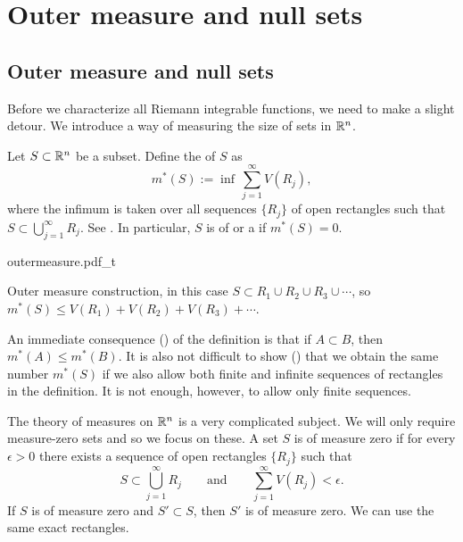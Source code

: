 
\sectionnewpage
\section{Outer measure and null sets}
\label{sec:outermeasure}


\subsection{Outer measure and null sets}

Before we characterize all Riemann integrable functions, we need to make
a slight detour.  We introduce a way of measuring the size of sets in ${\mathbb{R}}^n$.

\begin{defn}
Let 
$S \subset {\mathbb{R}}^n$ be a subset.  Define the \emph{}
of $S$ as
\begin{equation*}
m^*(S)
:=
\inf\,
\sum_{j=1}^\infty V(R_j) ,
\end{equation*}
where the infimum is taken over all sequences
$\{ R_j \}$ of open rectangles such that
$S \subset \bigcup_{j=1}^\infty R_j$.
See .
In particular, $S$ is of \emph{} or
a \emph{} if $m^*(S) = 0$.
\end{defn}

\begin{myfigureht}
{outermeasure.pdf_t}
\caption{Outer measure construction, in this case $S \subset R_1 \cup R_2
\cup R_3 \cup \cdots$, so $m^*(S) \leq V(R_1) + V(R_2)+V(R_3) + \cdots$.\label{fig:outermeasure}}
\end{myfigureht}

An immediate consequence ()
of the definition is that if $A \subset B$,
then $m^*(A) \leq m^*(B)$.
It is also not difficult to show ()
that we obtain the same number
$m^*(S)$ if we also allow both finite and infinite sequences
of rectangles in the definition.  It is not enough, however, to allow only
finite sequences.

The theory of measures on ${\mathbb{R}}^n$ is a very complicated subject.
We will only require measure-zero sets and so we focus on these.
A set $S$ is of measure zero if
for every $\epsilon > 0$
there exists a sequence of open rectangles $\{ R_j \}$ such that
\begin{equation} \label{mv:eq:nullR}
S \subset \bigcup_{j=1}^\infty R_j \qquad \text{and} \qquad
\sum_{j=1}^\infty V(R_j) < \epsilon.
\end{equation}
If $S$ is of measure zero and $S' \subset S$, then
$S'$ is of measure zero.  We can use the same exact rectangles.

